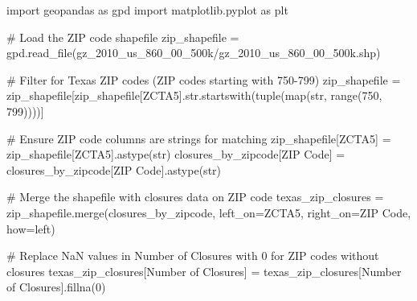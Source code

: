 \documentclass[
  letterpaper,
  DIV=11,
  numbers=noendperiod]{scrartcl}
\newenvironment{Shaded}{\begin{snugshade}}{\end{snugshade}}
\newcommand{\BuiltInTok}[1]{\textcolor[rgb]{0.00,0.23,0.31}{#1}}
\newcommand{\CommentTok}[1]{\textcolor[rgb]{0.37,0.37,0.37}{#1}}
\newcommand{\DecValTok}[1]{\textcolor[rgb]{0.68,0.00,0.00}{#1}}
\newcommand{\ImportTok}[1]{\textcolor[rgb]{0.00,0.46,0.62}{#1}}
\newcommand{\NormalTok}[1]{\textcolor[rgb]{0.00,0.23,0.31}{#1}}
\newcommand{\OperatorTok}[1]{\textcolor[rgb]{0.37,0.37,0.37}{#1}}
\newcommand{\StringTok}[1]{\textcolor[rgb]{0.13,0.47,0.30}{#1}}
\begin{document}
\begin{Shaded}
\begin{Highlighting}[]
\ImportTok{import}\NormalTok{ geopandas }\ImportTok{as}\NormalTok{ gpd}
\ImportTok{import}\NormalTok{ matplotlib.pyplot }\ImportTok{as}\NormalTok{ plt}

\CommentTok{\# Load the ZIP code shapefile}
\NormalTok{zip\_shapefile }\OperatorTok{=}\NormalTok{ gpd.read\_file(}\StringTok{\textquotesingle{}gz\_2010\_us\_860\_00\_500k/gz\_2010\_us\_860\_00\_500k.shp\textquotesingle{}}\NormalTok{)}

\CommentTok{\# Filter for Texas ZIP codes (ZIP codes starting with 750{-}799)}
\NormalTok{zip\_shapefile }\OperatorTok{=}\NormalTok{ zip\_shapefile[zip\_shapefile[}\StringTok{\textquotesingle{}ZCTA5\textquotesingle{}}\NormalTok{].}\BuiltInTok{str}\NormalTok{.startswith(}\BuiltInTok{tuple}\NormalTok{(}\BuiltInTok{map}\NormalTok{(}\BuiltInTok{str}\NormalTok{, }\BuiltInTok{range}\NormalTok{(}\DecValTok{750}\NormalTok{, }\DecValTok{799}\NormalTok{))))]}

\CommentTok{\# Ensure ZIP code columns are strings for matching}
\NormalTok{zip\_shapefile[}\StringTok{\textquotesingle{}ZCTA5\textquotesingle{}}\NormalTok{] }\OperatorTok{=}\NormalTok{ zip\_shapefile[}\StringTok{\textquotesingle{}ZCTA5\textquotesingle{}}\NormalTok{].astype(}\BuiltInTok{str}\NormalTok{)}
\NormalTok{closures\_by\_zipcode[}\StringTok{\textquotesingle{}ZIP Code\textquotesingle{}}\NormalTok{] }\OperatorTok{=}\NormalTok{ closures\_by\_zipcode[}\StringTok{\textquotesingle{}ZIP Code\textquotesingle{}}\NormalTok{].astype(}\BuiltInTok{str}\NormalTok{)}

\CommentTok{\# Merge the shapefile with closures data on ZIP code}
\NormalTok{texas\_zip\_closures }\OperatorTok{=}\NormalTok{ zip\_shapefile.merge(closures\_by\_zipcode, left\_on}\OperatorTok{=}\StringTok{\textquotesingle{}ZCTA5\textquotesingle{}}\NormalTok{, right\_on}\OperatorTok{=}\StringTok{\textquotesingle{}ZIP Code\textquotesingle{}}\NormalTok{, how}\OperatorTok{=}\StringTok{\textquotesingle{}left\textquotesingle{}}\NormalTok{)}

\CommentTok{\# Replace NaN values in \textquotesingle{}Number of Closures\textquotesingle{} with 0 for ZIP codes without closures}
\NormalTok{texas\_zip\_closures[}\StringTok{\textquotesingle{}Number of Closures\textquotesingle{}}\NormalTok{] }\OperatorTok{=}\NormalTok{ texas\_zip\_closures[}\StringTok{\textquotesingle{}Number of Closures\textquotesingle{}}\NormalTok{].fillna(}\DecValTok{0}\NormalTok{)}


\end{Highlighting}
\end{Shaded}
\end{document}
